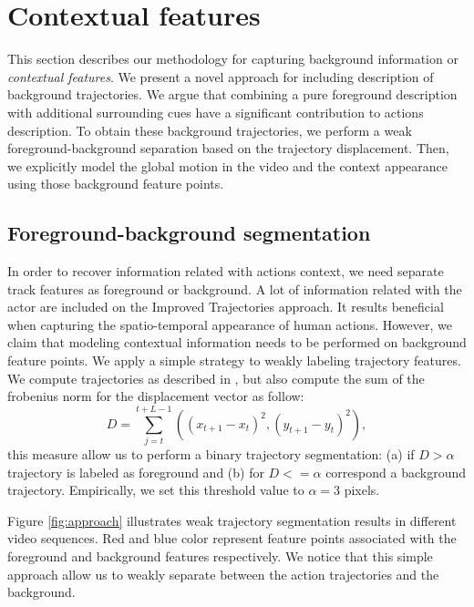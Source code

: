 \section{Contextual features}
\label{scene}
This section describes our methodology for capturing background information or \textit{contextual features}. We present a novel approach for including description of background trajectories. We argue that combining a pure foreground description \cite{wang2013} with additional surrounding cues have a significant contribution to actions description. To obtain these background trajectories, we perform a weak foreground-background separation based on the trajectory displacement. Then, we explicitly model the global motion in the video and the context appearance using those background feature points. 


\subsection{Foreground-background segmentation}
In order to recover information related with actions context, we need separate track features as foreground or background. A lot of information related with the actor are included on the Improved Trajectories approach. It results beneficial when capturing the spatio-temporal appearance of human actions. However, we claim that modeling contextual information needs to be performed on background feature points. We apply a simple strategy to weakly labeling trajectory features. We compute trajectories as described in \cite{wang2013}, but also compute the sum of the frobenius norm for the displacement vector as follow:
\begin{equation}
D = \sum _{j=t}^{t+L-1}\left ( (x_{t+1}-x_t)^2, (y_{t+1}-y_t)^2 \right ),
\end{equation}
this measure allow us to perform a binary trajectory segmentation: (a) if $D>\alpha$ trajectory is labeled as foreground and (b) for $D<=\alpha$ correspond a background trajectory. Empirically, we set this threshold value to $\alpha=3$ pixels.


Figure \ref{fig:approach} illustrates weak trajectory segmentation results in different video sequences. Red and blue color represent feature points associated with the foreground and background features respectively. We notice that this simple approach allow us to weakly separate between the action trajectories and the background. 

